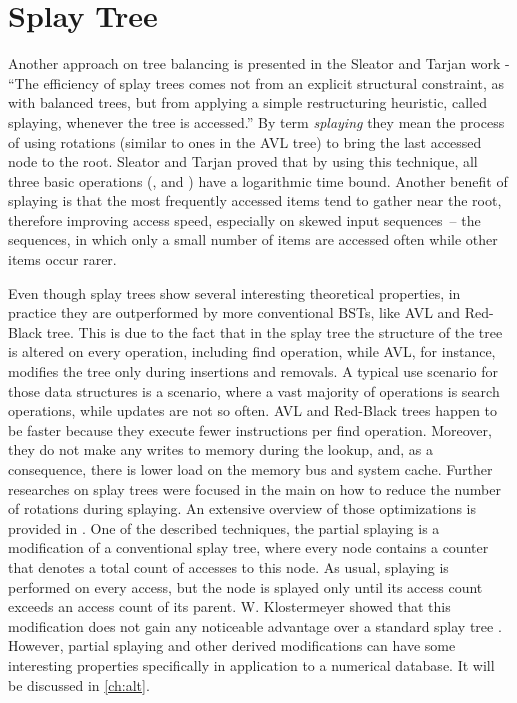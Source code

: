 \section{Splay Tree}
\label{sec:splay}
Another approach on tree balancing is presented in the Sleator and Tarjan work\cite{splay_tree} - ``The efficiency of splay trees comes not from an explicit structural constraint, as with balanced trees, but from applying a simple restructuring heuristic, called splaying, whenever the tree is accessed.'' By term \emph{splaying} they mean the process of using rotations (similar to ones in the AVL tree) to bring the last accessed node to the root. Sleator and Tarjan proved that by using this technique, all three basic operations (\findop, \insertop and \removeop) have a logarithmic time bound. Another benefit of splaying is that the most frequently accessed items tend to gather near the root, therefore improving access speed, especially on skewed input sequences~-- the sequences, in which only a small number of items are accessed often while other items occur rarer.

Even though splay trees show several interesting theoretical properties, in practice they are outperformed by more conventional BSTs, like AVL and Red-Black tree\cite{splay_overview}. This is due to the fact that in the splay tree the structure of the tree is altered on every operation, including find operation, while AVL, for instance, modifies the tree only during insertions and removals. A typical use scenario for those data structures is a scenario, where a vast majority of operations is search operations, while updates are not so often. AVL and Red-Black trees happen to be faster because they execute fewer instructions per find operation. Moreover, they do not make any writes to memory during the lookup, and, as a consequence, there is lower load on the memory bus and system cache. Further researches on splay trees were focused in the main on how to reduce the number of rotations during splaying. An extensive overview of those optimizations is provided in \cite{splay_overview}. One of the described techniques, the partial splaying is a modification of a conventional splay tree, where every node contains a counter that denotes a total count of accesses to this node. As usual, splaying is performed on every access, but the node is splayed only until its access count exceeds an access count of its parent. W. Klostermeyer showed that this modification does not gain any noticeable advantage over a standard splay tree \cite{partial_splaying}. However, partial splaying and other derived modifications can have some interesting properties specifically in application to a numerical database. It will be discussed in \cref{ch:alt}.

